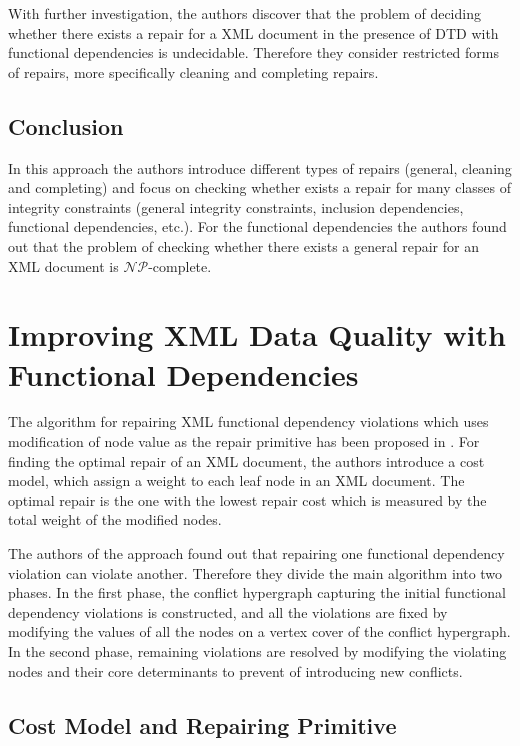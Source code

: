 With further investigation, the authors discover that the problem of deciding whether there exists a repair for a XML document in the presence of DTD with functional dependencies is undecidable. Therefore they consider restricted forms of repairs, more specifically cleaning and completing repairs.

\subsection{Conclusion}

In this approach the authors introduce different types of repairs (general, cleaning and completing) and focus on checking whether exists a repair for many classes of integrity constraints (general integrity constraints, inclusion dependencies, functional dependencies, etc.). For the functional dependencies the authors found out that the problem of checking whether there exists a general repair for an XML document is $\mathcal{NP}$-complete.


\section{Improving XML Data Quality with Functional Dependencies}

The algorithm for repairing XML functional dependency violations which uses modification of node value as the repair primitive has been proposed in \cite{ImprovingXML}. For finding the optimal repair of an XML document, the authors introduce a cost model, which assign a weight to each leaf node in an XML document. The optimal repair is the one with the lowest repair cost which is measured by the total weight of the modified nodes.

The authors of the approach found out that repairing one functional dependency violation can violate another. Therefore they divide the main algorithm into two phases. In the first phase, the conflict hypergraph capturing the initial functional dependency violations is constructed, and all the violations are fixed by modifying the values of all the nodes on a vertex cover of the conflict hypergraph. In the second phase, remaining violations are resolved by modifying the violating nodes and their core determinants to prevent of introducing new conflicts.

\subsection{Cost Model and Repairing Primitive}

